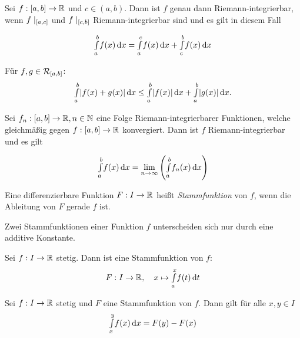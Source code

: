 \documentclass{cheat-sheet}
\begin{document}

\begin{satz}
Sei $f : \left[ a, b \right] \to \mathbb{R}$ und $c \in (a, b)$. Dann ist $f$ genau dann Riemann-integrierbar, wenn $f\mid_{\left[ a, c \right]}$ und $f\mid_{\left[ c, b \right]}$ Riemann-integrierbar sind und es gilt in diesem Fall

\[ {\textstyle \int\limits_{a}^{b}} f(x) \,\mathrm{d} x = {\textstyle \int\limits_{a}^{c}} f(x) \,\mathrm{d} x + {\textstyle \int\limits_{c}^{b}} f(x) \,\mathrm{d} x \]
\end{satz}


\begin{satz}
  Für $f, g \in \mathcal{R}_{\left[ a, b \right]}$:
  \[ {\textstyle \int\limits_{a}^{b}} \lvert f(x) + g(x)\rvert \,\mathrm{d} x \le {\textstyle \int\limits_{a}^{b}} \lvert f(x)\rvert \,\mathrm{d} x + {\textstyle \int\limits_{a}^{b}} \lvert g(x)\rvert \,\mathrm{d} x. \]
\end{satz}

\begin{satz}
  Sei $f_n : \left[ a, b \right] \to \mathbb{R}, n \in \mathbb{N}$ eine Folge Riemann-integrierbarer Funktionen, welche gleichmäßig gegen $f : \left[ a, b \right] \to \mathbb{R}$ konvergiert. Dann ist $f$ Riemann-integrierbar und es gilt

  \[ {\textstyle \int\limits_{a}^{b}} f(x) \,\mathrm{d} x = \lim_{n \to \infty} \left({\textstyle \int\limits_{a}^{b}} f_n(x) \,\mathrm{d} x \right) \]
\end{satz}

\begin{defn}
Eine differenzierbare Funktion $F: I \to \mathbb{R}$ heißt \emph{Stammfunktion} von $f$, wenn die Ableitung von $F$ gerade $f$ ist.
\end{defn}

\begin{bem}
Zwei Stammfunktionen einer Funktion $f$ unterscheiden sich nur durch eine additive Konstante.
\end{bem}

\begin{satz}
Sei $f : I \to \mathbb{R}$ stetig. Dann ist eine Stammfunktion von $f$:
\[ F : I \to \mathbb{R}, \quad x \mapsto {\textstyle \int\limits_{a}^{x}} f(t) \,\mathrm{d} t \]
\end{satz}

\begin{satz}
  Sei $f : I \to \mathbb{R}$ stetig und $F$ eine Stammfunktion von $f$. Dann gilt für alle $x, y \in I$
  \[ {\textstyle \int\limits_{x}^{y}} f(x) \,\mathrm{d} x = F(y) - F(x) \]
\end{satz}
\end{document}
